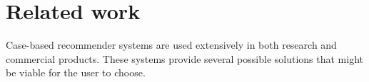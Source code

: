
\chapter{Related work}

Case-based recommender systems are used extensively in both research and commercial products. These systems provide several possible solutions that might be viable for the user to choose. 

\cleardoublepage